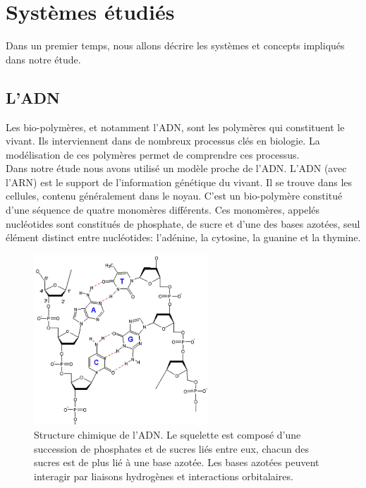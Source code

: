 \documentclass[a4paper,11pt]{article}
\begin{document}
\tableofcontents



\newpage 

\section{Systèmes étudiés}
Dans un premier temps, nous allons décrire les systèmes et concepts impliqués dans notre étude.


\subsection{L'ADN}

Les bio-polymères, et notamment l'ADN, sont les polymères qui constituent le vivant. Ils interviennent dans de nombreux processus clés en biologie. La modélisation de ces polymères permet de comprendre ces processus.\\

Dans notre étude nous avons utilisé un modèle proche de l'ADN. L'ADN (avec l'ARN) est le support de l'information génétique du vivant. Il se trouve dans les cellules, contenu généralement dans le noyau. C'est un bio-polymère constitué d'une séquence de quatre monomères différents. Ces monomères, appelés nucléotides sont constitués de phosphate, de sucre et d'une des bases azotées, seul élément distinct entre nucléotides: l'adénine, la cytosine, la guanine et la thymine. 

\begin{figure}[H]
\begin{center}
\includegraphics[width=0.58\textwidth]{adn.jpg}

\caption{Structure chimique de l'ADN. Le squelette est composé d'une succession de phosphates et de sucres liés entre eux, chacun des sucres est de plus lié à une base azotée. Les bases azotées peuvent interagir par liaisons hydrogènes et interactions orbitalaires.}
\label{adn}
\end{center}
\end{figure}
\end{document}
